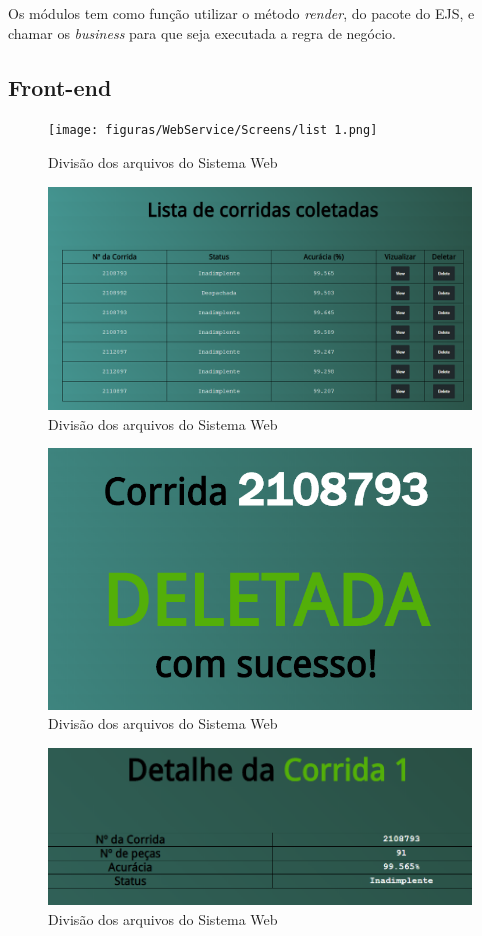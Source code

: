 Os módulos tem como função utilizar o método \textit{render}, do pacote do EJS, e chamar os \textit{business} para que seja executada a regra de negócio.   


\subsection{Front-end}


\begin{figure}[htbp]
	\centering
	\texttt{[image: figuras/WebService/Screens/list  1.png]}
	\caption{Divisão dos arquivos do Sistema Web}
	\label{fig:list1}
\end{figure}

\begin{figure}[htbp]
	\centering
	\includegraphics[width=1\linewidth]{figuras/WebService/Screens/list 2.png}
	\caption{Divisão dos arquivos do Sistema Web}
	\label{fig:cleanArchtecture}
\end{figure}

\begin{figure}[htbp]
	\centering
	\includegraphics[width=0.5\linewidth]{figuras/WebService/Screens/corrida_delete.png}
	\caption{Divisão dos arquivos do Sistema Web}
	\label{fig:cleanArchtecture}
\end{figure}

\begin{figure}[htbp]
	\centering
	\includegraphics[width=0.8\linewidth]{figuras/WebService/Screens/detail 1.png}
	\caption{Divisão dos arquivos do Sistema Web}
	\label{fig:cleanArchtecture}
\end{figure}

